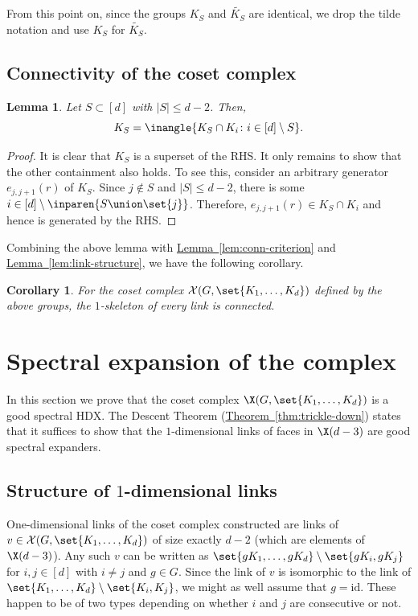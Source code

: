 \documentclass[11pt]{article}
\newcommand{\expref}[2]{\texorpdfstring{\hyperref[#2]{#1~\ref{#2}}}{#1~\ref{#2}}}
\newtheorem{lemma}[theorem]{Lemma}
\newtheorem{corollary}[theorem]{Corollary}
\begin{document}
\noindent
From this point on, since the groups $K_S$ and $\widetilde{K_S}$ are identical, we drop the tilde notation and use $K_S$ for $\widetilde{K_S}$. 

\subsection{Connectivity of the coset complex}

\begin{lemma}\label{lem:KS-intersection-property}
  Let $S \subset [d]$ with $|S| \leq d-2$. Then,
  \[
    K_S= \inangle{K_{S} \cap K_i\colon i \in [d] \setminus
      S}. 
  \]
\end{lemma}
\begin{proof}
  It is clear that $K_S$ is a superset of the RHS. It only remains to show that the other containment also holds. To see this, consider an arbitrary generator $e_{j,j+1}(r)$ of $K_S$. Since $j \notin S$ and $|S| \leq d-2$, there is some $i \in [d] \setminus \inparen{S \union \set{j}}$. Therefore, $e_{j,j+1}(r) \in K_S \cap K_i$ and hence is generated by the RHS. 
\end{proof}

\noindent
Combining the above lemma with \expref{Lemma}{lem:conn-criterion} and \expref{Lemma}{lem:link-structure}, we have the following corollary.

\begin{corollary}
  For the coset complex $\mathcal{X}(G,\set{K_1,\ldots, K_d})$ defined by the above groups, the $1$-skeleton of every link is connected. 
\end{corollary}

\section{Spectral expansion of the complex}

In this section we prove that the coset complex $\X(G,\set{K_1,\ldots, K_d})$ 
is a good spectral HDX. The
%
Descent Theorem (\expref{Theorem}{thm:trickle-down})  %
states that it suffices to show that the $1$-dimensional links of 
faces in $\X(d-3)$ are good spectral expanders.

\subsection{Structure of $1$-dimensional links}

One-dimensional %
links of the coset complex constructed are links of $v
\in \mathcal{X}(G,\set{K_1,\ldots, K_d})$ of size exactly $d-2$ (which are elements of $\X(d-3)$). Any
such $v$ can be written as $\set{gK_1,\ldots, gK_d} \setminus
\set{gK_{i},gK_{j}}$ for $i,j\in [d]$ with $i \neq j$ and $g \in
G$. Since the link of $v$ is isomorphic to the link of $\set{K_1,\ldots, K_d} \setminus
\set{K_{i},K_{j}}$, we might as well assume that $g=\mathrm{id}$.
These happen to be of two types depending on whether $i$ and $j$ are
consecutive or not. 
\end{document}
